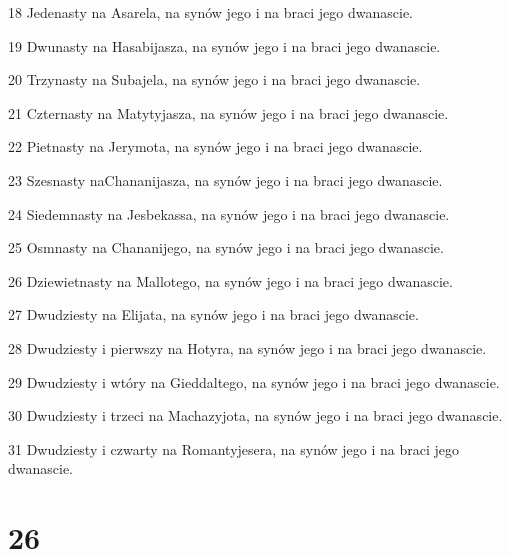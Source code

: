 \par 18 Jedenasty na Asarela, na synów jego i na braci jego dwanascie.
\par 19 Dwunasty na Hasabijasza, na synów jego i na braci jego dwanascie.
\par 20 Trzynasty na Subajela, na synów jego i na braci jego dwanascie.
\par 21 Czternasty na Matytyjasza, na synów jego i na braci jego dwanascie.
\par 22 Pietnasty na Jerymota, na synów jego i na braci jego dwanascie.
\par 23 Szesnasty naChananijasza, na synów jego i na braci jego dwanascie.
\par 24 Siedemnasty na Jesbekassa, na synów jego i na braci jego dwanascie.
\par 25 Osmnasty na Chananijego, na synów jego i na braci jego dwanascie.
\par 26 Dziewietnasty na Mallotego, na synów jego i na braci jego dwanascie.
\par 27 Dwudziesty na Elijata, na synów jego i na braci jego dwanascie.
\par 28 Dwudziesty i pierwszy na Hotyra, na synów jego i na braci jego dwanascie.
\par 29 Dwudziesty i wtóry na Gieddaltego, na synów jego i na braci jego dwanascie.
\par 30 Dwudziesty i trzeci na Machazyjota, na synów jego i na braci jego dwanascie.
\par 31 Dwudziesty i czwarty na Romantyjesera, na synów jego i na braci jego dwanascie.

\chapter{26}

